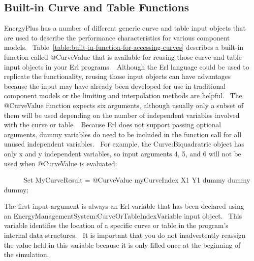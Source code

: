 \subsection{Built-in Curve and Table Functions}\label{built-in-curve-and-table-functions}

EnergyPlus has a number of different generic curve and table input objects that are used to describe the performance characteristics for various component models.~ Table~\ref{table:built-in-function-for-accessing-curves} describes a built-in function called @CurveValue that is available for reusing those curve and table input objects in your Erl programs.~ Although the Erl language could be used to replicate the functionality, reusing those input objects can have advantages because the input may have already been developed for use in traditional component models or the limiting and interpolation methods are helpful.~ The @CurveValue function expects six arguments, although usually only a subset of them will be used depending on the number of independent variables involved with the curve or table.~ Because Erl does not support passing optional arguments, dummy variables do need to be included in the function call for all unused independent variables.~ For example, the Curve:Biquadratric object has only x and y independent variables, so input arguments 4, 5, and 6 will not be used when @CurveValue is evaluated:

~~~~~ Set MyCurveResult = @CurveValue myCurveIndex X1 Y1 dummy dummy dummy;

The first input argument is always an Erl variable that has been declared using an EnergyManagementSystem:CurveOrTableIndexVariable input object.~ This variable identifies the location of a specific curve or table in the program's internal data structures.~ It is important that you do not inadvertently reassign the value held in this variable because it is only filled once at the beginning of the simulation.

